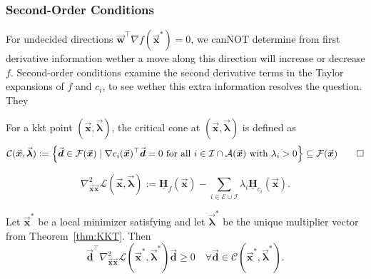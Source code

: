 \documentclass[9pt, headings=standardclasses, parskip=half]{scrartcl}
\makeatletter
\renewcommand{\emph}[1]{\textcolor{mypurple}{#1}}
\newenvironment{verticalhack}
  {\begin{array}[b]{@{}c@{}}\displaystyle}
  {\\\noalign{\hrule height0pt}\end{array}} %
\newcommand{\matr}[1]{\underline{\boldsymbol{#1}}}
\newcommand{\vect}[1]{\vec{\boldsymbol{#1}}}
\makeatother
\begin{document}

\subsubsection{Second-Order Conditions}




For undecided directions \(\vect{w}^\top \nabla f(\vect{x}^{\ast}) = 0\), we canNOT determine from first derivative information wether a move along this direction will increase or decrease \(f\).
Second-order conditions examine the second derivative terms in the Taylor expansions of \(f\) and \(c_i\), to see wether this extra information resolves the question.
They
\begin{definition}\label{def:critical_cone}
  For a \gls{kkt} point \( (\vect{x},\vect{\lambda}) \), the \emph{critical cone} at \((\vect{x},\vect{\lambda})\) is defined as
  \begin{equation}\label{eq:critical_cone}
    \mathcal{C}(\vect{x},\vect{\lambda}) := \left\{ \vect{d}\in\mathcal{F}(\vect{x}) \mid \nabla c_{i}(\vect{x})^{\top} \vect{d} = 0 \text{ for all } i\in\mathcal{I}\cap\mathcal{A}(\vect{x}) \text{ with } \lambda_{i}>0\right\}  \subseteq \mathcal{F}(\vect{x}) 
  \qedhere
  \end{equation}
\end{definition}




\begin{definition}\label{def:Lagrangian_Hessian}
  \[
    \nabla^{2}_{\vect{x}\vect{x}} \mathcal{L}(\vect{x},\vect{\lambda}) := \matr{H}_{f}(\vect{x}) - \sum_{i\in\mathcal{E}\cup\mathcal{I}} \lambda_{i} \matr{H}_{c_{i}}(\vect{x}).
   \]
\end{definition}

\begin{theorem}\label{thm:SONC}
  Let \( \vect{x}^{\ast} \) be a local minimizer satisfying  and let \( \vect{\lambda}^{\ast} \) be the unique multiplier vector from Theorem~\ref{thm:KKT}. Then
  \[
    \vect{d}^{\top} \nabla^{2}_{\vect{x}\vect{x}} \mathcal{L}(\vect{x}^{\ast},\vect{\lambda}^{\ast}) \vect{d} \ge 0 \quad \forall \vect{d}\in\mathcal{C}(\vect{x}^{\ast},\vect{\lambda}^{\ast}).
  \]
\end{theorem}
\end{document}
